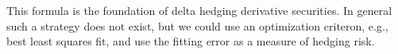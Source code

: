 \documentclass[fleqn]{amsart}
\newcommand{\Cov}{\mathop{\rm{Cov}}}
\providecommand{\pair}[1]{\langle#1\rangle}
\begin{document}
This formula is the foundation of delta hedging derivative securities.
In general such a strategy does not exist, but we could use an
optimization criteron, e.g., best least squares fit, and use the
fitting error as a measure of hedging risk.

%
%
%
%
%
\end{document}
